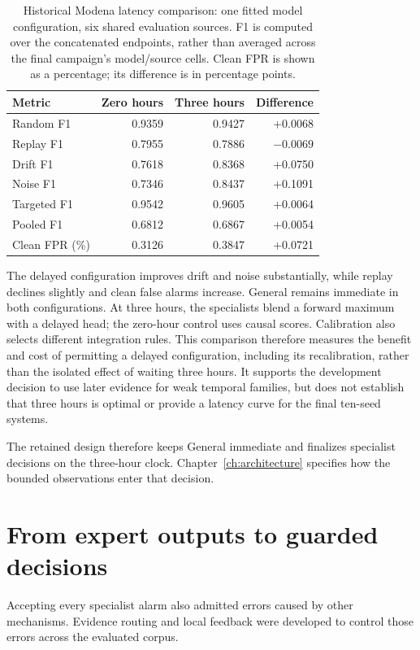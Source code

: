 \begin{table}[!htbp]
\centering\small
\caption[Historical Modena comparison of zero and three hours]{Historical Modena latency comparison: one fitted model configuration, six shared evaluation sources. F1 is computed over the concatenated endpoints, rather than averaged across the final campaign's model/source cells. Clean FPR is shown as a percentage; its difference is in percentage points.}
\label{tab:historicaldelay}
\begin{tabular}{@{}lrrr@{}}
\toprule
Metric & Zero hours & Three hours & Difference\\
\midrule
Random F1 & 0.9359 & 0.9427 & +0.0068\\
Replay F1 & 0.7955 & 0.7886 & $-0.0069$\\
Drift F1 & 0.7618 & 0.8368 & +0.0750\\
Noise F1 & 0.7346 & 0.8437 & +0.1091\\
Targeted F1 & 0.9542 & 0.9605 & +0.0064\\
Pooled F1 & 0.6812 & 0.6867 & +0.0054\\
Clean FPR (\%) & 0.3126 & 0.3847 & +0.0721\\
\bottomrule
\end{tabular}
\end{table}

The delayed configuration improves drift and noise substantially, while replay declines slightly and clean false alarms increase. General remains immediate in both configurations. At three hours, the specialists blend a forward maximum with a delayed head; the zero-hour control uses causal scores. Calibration also selects different integration rules. This comparison therefore measures the benefit and cost of permitting a delayed configuration, including its recalibration, rather than the isolated effect of waiting three hours. It supports the development decision to use later evidence for weak temporal families, but does not establish that three hours is optimal or provide a latency curve for the final ten-seed systems.

The retained design therefore keeps General immediate and finalizes specialist decisions on the three-hour clock. Chapter~\ref{ch:architecture} specifies how the bounded observations enter that decision.

\section{From expert outputs to guarded decisions}
Accepting every specialist alarm also admitted errors caused by other mechanisms. Evidence routing and local feedback were developed to control those errors across the evaluated corpus.

